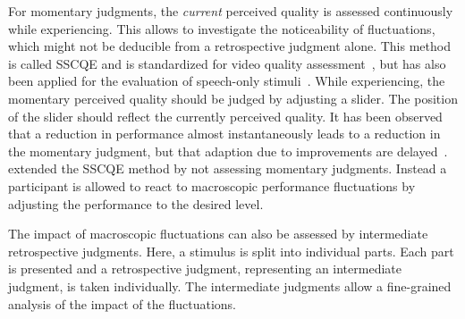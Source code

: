For momentary judgments, the \emph{current} perceived quality is assessed continuously while experiencing.
This allows to investigate the noticeability of fluctuations, which might not be deducible from a retrospective judgment alone.
This method is called \ac{SSCQE} and is standardized for video quality assessment~\citep[][]{itu-r_recommendation_bt.500-13_methodology_2012}, but has also been applied for the evaluation of speech-only stimuli~\citep[\eg,][]{gros_instantaneous_2001}.
While experiencing, the momentary perceived quality should be judged by adjusting a slider.
The position of the slider should reflect the currently perceived quality.
It has been observed that a reduction in performance almost instantaneously leads to a reduction in the momentary judgment, but that adaption due to improvements are delayed~\citep[\eg,][]{hands_recency_2001, gros_instantaneous_2001, hamberg_time-varying_1999}.
\citet{borowiak_long_2013} extended the \ac{SSCQE} method by not assessing momentary judgments.
Instead a participant is allowed to react to macroscopic performance fluctuations by adjusting the performance to the desired level.

The impact of macroscopic fluctuations can also be assessed by intermediate retrospective judgments.
Here, a stimulus is split into individual parts.
Each part is presented and a retrospective judgment, representing an intermediate judgment, is taken individually.
The intermediate judgments allow a fine-grained analysis of the impact of the fluctuations.


